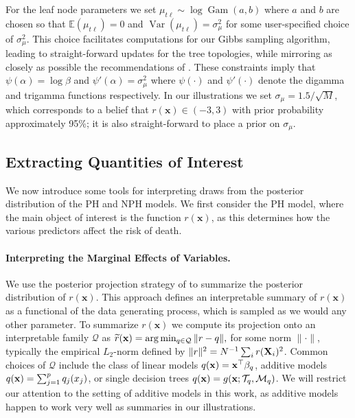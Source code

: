 \documentclass[12pt]{article}
\newcommand{\E}{\mathbb E}
\newcommand{\Gam}{\operatorname{Gam}}
\newcommand{\sM}{\mathcal M}
\newcommand{\sQ}{\mathcal Q}
\newcommand{\Tree}{\mathcal T}
\newcommand{\Var}{\operatorname{Var}}
\newcommand{\bx}{\mathbf{x}}
\newcommand{\bfX}{{\bf X}}
\newcommand{\bfx}{{\bf x}}
\begin{document}
For the leaf node parameters we set $\mu_{t\ell} \sim \log \Gam(a, b)$ where $a$ and $b$ are chosen so that $\E(\mu_{t\ell}) = 0$ and $\Var(\mu_{t\ell}) = \sigma^2_\mu$ for some user-specified choice of $\sigma^2_\mu$. This choice facilitates computations for our Gibbs sampling algorithm, leading to straight-forward updates for the tree topologies, while mirroring as closely as possible the recommendations of \citet{chipman2010bart}. These constraints imply that $\psi(\alpha) = \log \beta$ and $\psi'(\alpha) = \sigma^2_\mu$ where $\psi(\cdot)$ and $\psi'(\cdot)$ denote the digamma and trigamma functions respectively. In our illustrations we set $\sigma_\mu = 1.5 / \sqrt{M}$, which corresponds to a belief that $r(\bx) \in (-3, 3)$ with prior probability approximately 95\%; it is also straight-forward to place a prior on $\sigma_\mu$.

\subsection{Extracting Quantities of Interest}

We now introduce some tools for interpreting draws from the posterior distribution of the PH and NPH models. We first consider the PH model, where the main object of interest is the function $r(\bx)$, as this determines how the various predictors affect the risk of death. 

\paragraph{Interpreting the Marginal Effects of Variables.}
We use the posterior projection strategy of \citet{woody2020model} to summarize the posterior distribution of $r(\bx)$. This approach defines an interpretable summary of $r(\bx)$ as a functional of the data generating process, which is sampled as we would any other parameter. To summarize $r(\bx)$ we compute its projection onto an interpretable family $\sQ$ as
\begin{math}
    \widetilde r(\bfx) = \arg \min_{q \in \sQ} \|r - q\|,
\end{math}
for some norm $\|\cdot\|$, typically the empirical $L_2$-norm defined by  $\|r\|^2 = N^{-1} \sum_i r(\bfX_i)^2$. Common choices of $\sQ$ include the class  of linear models $q(\bfx) = \bfx^\top \beta_q$, additive models $q(\bfx) = \sum_{j=1}^p  q_j(x_j)$, or single decision trees $q(\bfx) = g(\bfx; \Tree_q, \sM_q)$. We will restrict our attention to the setting of additive models in this work, as additive models happen to work very well as summaries in our illustrations.
\end{document}
